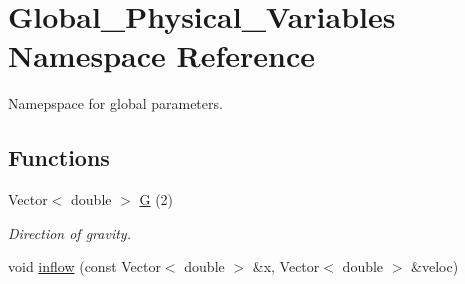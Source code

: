 \hypertarget{namespaceGlobal__Physical__Variables}{}\section{Global\+\_\+\+Physical\+\_\+\+Variables Namespace Reference}
\label{namespaceGlobal__Physical__Variables}


Namepspace for global parameters.  


\subsection*{Functions}
\begin{DoxyCompactItemize}
\item 
Vector$<$ double $>$ \hyperlink{namespaceGlobal__Physical__Variables_a18fe245262ec8beec764c805bb93e73c}{G} (2)
\begin{DoxyCompactList}\small\item\em Direction of gravity. \end{DoxyCompactList}\item 
void \hyperlink{namespaceGlobal__Physical__Variables_a08e9835d71b7f7194ec5475f139211be}{inflow} (const Vector$<$ double $>$ \&x, Vector$<$ double $>$ \&veloc)
\end{DoxyCompactItemize}
